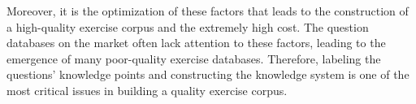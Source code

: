 Moreover, it is the optimization of these factors that leads to the construction of a high-quality exercise corpus and the extremely high cost. The question databases on the market often lack attention to these factors, leading to the emergence of many poor-quality exercise databases. Therefore, labeling the questions' knowledge points and constructing the knowledge system is one of the most critical issues in building a quality exercise corpus.


